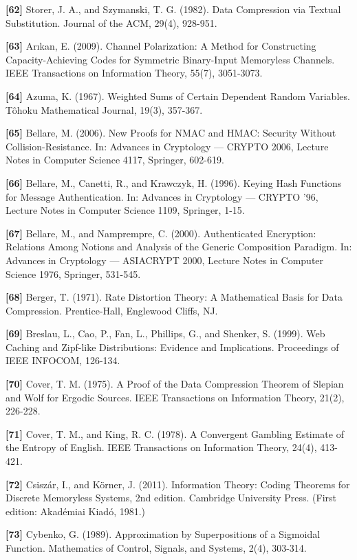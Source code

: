 \documentclass[
]{article}
\begin{document}
\textbf{{[}62{]}} Storer, J. A., and Szymanski, T. G. (1982). Data
Compression via Textual Substitution. Journal of the ACM, 29(4),
928-951.

\textbf{{[}63{]}} Ar{\i}kan, E. (2009). Channel Polarization: A Method
for Constructing Capacity-Achieving Codes for Symmetric Binary-Input
Memoryless Channels. IEEE Transactions on Information Theory, 55(7),
3051-3073.

\textbf{{[}64{]}} Azuma, K. (1967). Weighted Sums of Certain Dependent
Random Variables. T\^ohoku Mathematical Journal, 19(3), 357-367.

\textbf{{[}65{]}} Bellare, M. (2006). New Proofs for NMAC and HMAC:
Security Without Collision-Resistance. In: Advances in Cryptology ---
CRYPTO 2006, Lecture Notes in Computer Science 4117, Springer, 602-619.

\textbf{{[}66{]}} Bellare, M., Canetti, R., and Krawczyk, H. (1996).
Keying Hash Functions for Message Authentication. In: Advances in
Cryptology --- CRYPTO '96, Lecture Notes in Computer Science 1109,
Springer, 1-15.

\textbf{{[}67{]}} Bellare, M., and Namprempre, C. (2000). Authenticated
Encryption: Relations Among Notions and Analysis of the Generic
Composition Paradigm. In: Advances in Cryptology --- ASIACRYPT 2000,
Lecture Notes in Computer Science 1976, Springer, 531-545.

\textbf{{[}68{]}} Berger, T. (1971). Rate Distortion Theory: A
Mathematical Basis for Data Compression. Prentice-Hall, Englewood
Cliffs, NJ.

\textbf{{[}69{]}} Breslau, L., Cao, P., Fan, L., Phillips, G., and
Shenker, S. (1999). Web Caching and Zipf-like Distributions: Evidence
and Implications. Proceedings of IEEE INFOCOM, 126-134.

\textbf{{[}70{]}} Cover, T. M. (1975). A Proof of the Data Compression
Theorem of Slepian and Wolf for Ergodic Sources. IEEE Transactions on
Information Theory, 21(2), 226-228.

\textbf{{[}71{]}} Cover, T. M., and King, R. C. (1978). A Convergent
Gambling Estimate of the Entropy of English. IEEE Transactions on
Information Theory, 24(4), 413-421.

\textbf{{[}72{]}} Csisz\'ar, I., and K\"orner, J. (2011). Information
Theory: Coding Theorems for Discrete Memoryless Systems, 2nd edition.
Cambridge University Press. (First edition: Akad\'emiai Kiad\'o, 1981.)

\textbf{{[}73{]}} Cybenko, G. (1989). Approximation by Superpositions
of a Sigmoidal Function. Mathematics of Control, Signals, and Systems,
2(4), 303-314.
\end{document}
